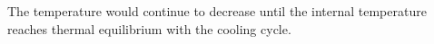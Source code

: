 The temperature would continue to decrease until the internal temperature reaches thermal equilibrium with the cooling cycle.